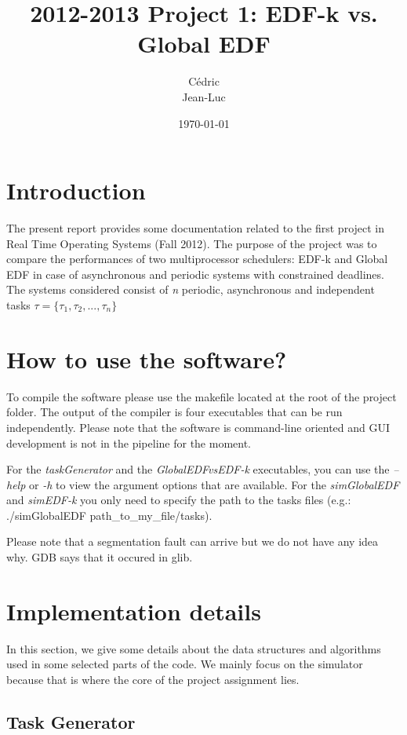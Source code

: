 \documentclass[11pt, a4paper,titlepage]{article}
\title{2012-2013 Project 1: EDF-k vs. Global EDF}
\author{
	Cédric \bsc{Lood}\\
	Jean-Luc \bsc{Zirani}
}
\date{\today}
\begin{document}
\maketitle

\tableofcontents
\clearpage

\section{Introduction}

The present report provides some documentation related to the first project in Real Time Operating Systems (Fall 2012). The purpose of the project was to compare the performances of two multiprocessor schedulers: EDF-k and Global EDF in case of asynchronous and periodic systems with constrained deadlines.
The systems considered consist of \emph{n} periodic, asynchronous and independent tasks $  \tau = \{ \tau_1, \tau_2, ..., \tau_n \}  $

\section{How to use the software?}

To compile the software please use the makefile located at the root of the project folder. The output of the compiler is four executables that can be run independently. Please note that the software is command-line oriented and GUI development is not in the pipeline for the moment. 

For the \emph{taskGenerator} and the \emph{GlobalEDFvsEDF-k} executables, you can use the \emph{--help} or \emph{-h} to view the argument options that are available. 
For the \emph{simGlobalEDF} and \emph{simEDF-k} you only need to specify the path to the tasks files (e.g.: ./simGlobalEDF path\_to\_my\_file/tasks).

Please note that a segmentation fault can arrive but we do not have any idea why. 
GDB says that it occured in glib.

\section{Implementation details}

In this section, we give some details about the data structures and algorithms used in some selected parts of the code. We mainly focus on the simulator because that is where the core of the project assignment lies.

\subsection{Task Generator}
\end{document}

